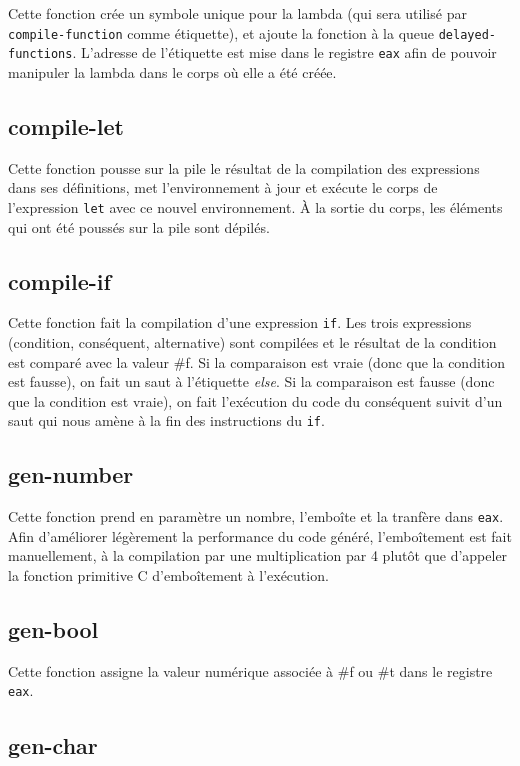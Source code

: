 \documentclass[10pt]{report}
\begin{document}
Cette fonction crée un symbole unique pour la lambda (qui sera utilisé
par {\tt compile-function} comme étiquette), et ajoute la fonction à
la queue {\tt delayed-functions}.  L'adresse de l'étiquette est mise
dans le registre {\tt eax} afin de pouvoir manipuler la lambda dans le
corps où elle a été créée.

\subsection{compile-let}

Cette fonction pousse sur la pile le résultat de la compilation des
expressions dans ses définitions, met l'environnement à jour et
exécute le corps de l'expression {\tt let} avec ce nouvel
environnement.  À la sortie du corps, les éléments qui ont été poussés
sur la pile sont dépilés.

\subsection{compile-if}

Cette fonction fait la compilation d'une expression {\tt if}. Les
trois expressions (condition, conséquent, alternative) sont compilées
et le résultat de la condition est comparé avec la valeur \#f. Si la
comparaison est vraie (donc que la condition est fausse), on fait un
saut à l'étiquette {\it else}. Si la comparaison est fausse (donc que
la condition est vraie), on fait l'exécution du code du conséquent
suivit d'un saut qui nous amène à la fin des instructions du {\tt if}.

\subsection{gen-number}

Cette fonction prend en paramètre un nombre, l'emboîte et la tranfère
dans {\tt eax}. Afin d'améliorer légèrement la performance du code
généré, l'emboîtement est fait manuellement, à la compilation par une
multiplication par 4 plutôt que d'appeler la fonction primitive C
d'emboîtement à l'exécution.

\subsection{gen-bool}

Cette fonction assigne la valeur numérique associée à \#f ou \#t dans
le registre {\tt eax}.

\subsection{gen-char}
\end{document}
